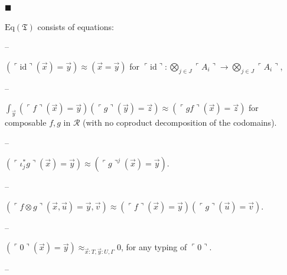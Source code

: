  
 
\par\noindent  $\blacksquare$ 
 
$\mathrm{Eq}(\mathfrak{T})$ consists of equations:\par
  
\par\noindent  – 
 
$\left(\ulcorner\mathrm{id}\urcorner(\vec{x})=\vec{y}\right)\approx(\vec{x}=%
\vec{y})$ for $\ulcorner\mathrm{id}\urcorner:\bigotimes_{j\in J}\ulcorner A_{i}\urcorner\to%
\bigotimes_{j\in J}\ulcorner A_{i}\urcorner$,\par
 
 
 
\par\noindent  – 
 
$\int_{\vec{y}}(\ulcorner f\urcorner(\vec{x})=\vec{y})(\ulcorner g\urcorner(%
\vec{y})=\vec{z})\approx(\ulcorner gf\urcorner(\vec{x})=\vec{z})$ for composable $f,g$ in $\mathcal{R}$ (with no coproduct decomposition of the codomains).\par
 
 
 
\par\noindent  – 
 
$(\ulcorner\iota^{*}_{j}g\urcorner(\vec{x})=\vec{y})\approx(\ulcorner g%
\urcorner^{j}(\vec{x})=\vec{y})$.\par
 
 
 
\par\noindent  – 
 
$(\ulcorner f\otimes g\urcorner(\vec{x},\vec{u})=\vec{y},\vec{v})\approx(%
\ulcorner f\urcorner(\vec{x})=\vec{y})(\ulcorner g\urcorner(\vec{u})=\vec{v})$.\par
 
 
 
\par\noindent  – 
 
$(\ulcorner 0\urcorner(\vec{x})=\vec{y})\approx_{\vec{x}:T,\vec{y}:U,\Gamma}0$, for any typing of $\ulcorner 0\urcorner$.\par
 
 
 
\par\noindent  – 
 
